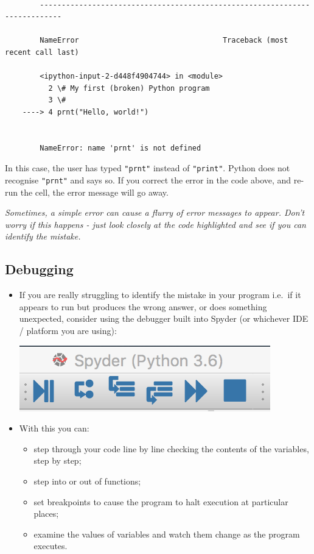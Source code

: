 \documentclass[10pt]{article}
\providecommand{\tightlist}{%
      \setlength{\itemsep}{0pt}\setlength{\parskip}{0pt}}
\begin{document}
    \begin{Verbatim}[commandchars=\\\{\}]

        ---------------------------------------------------------------------------

        NameError                                 Traceback (most recent call last)

        <ipython-input-2-d448f4904744> in <module>
          2 \# My first (broken) Python program
          3 \#
    ----> 4 prnt("Hello, world!")
    

        NameError: name 'prnt' is not defined

    \end{Verbatim}

    In this case, the user has typed \texttt{"prnt"} instead of
\texttt{"print"}. Python does not recognise \texttt{"prnt"} and says so.
If you correct the error in the code above, and re-run the cell, the
error message will go away.

\emph{Sometimes, a simple error can cause a flurry of error messages to
appear. Don't worry if this happens - just look closely at the code
highlighted and see if you can identify the mistake.}

    \hypertarget{debugging}{%
\subsection{Debugging}\label{debugging}}

\begin{itemize}
\tightlist
\item
  If you are really struggling to identify the mistake in your program
  i.e.~if it appears to run but produces the wrong answer, or does
  something unexpected, consider using the debugger built into Spyder
  (or whichever IDE / platform you are using):
  
  \includegraphics[width=0.6\linewidth]{debug1.png}

\item
  With this you can:

  \begin{itemize}
  \tightlist
  \item
    step through your code line by line checking the contents of the
    variables, step by step;
  \item
    step into or out of functions;
  \item
    set breakpoints to cause the program to halt execution at particular
    places;
  \item
    examine the values of variables and watch them change as the program
    executes.
  \end{itemize}
\end{itemize}
\end{document}
